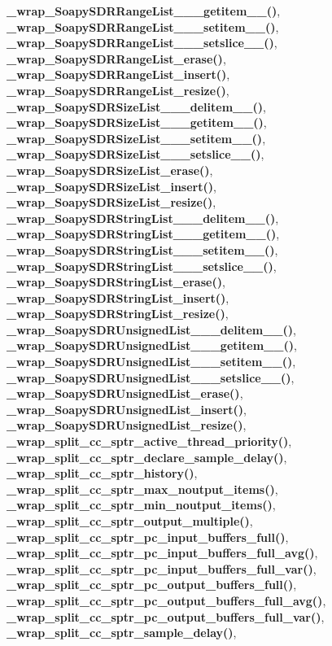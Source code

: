 {\bf \+\_\+wrap\+\_\+\+Soapy\+S\+D\+R\+Range\+List\+\_\+\+\_\+\+\_\+getitem\+\_\+\+\_\+()}, {\bf \+\_\+wrap\+\_\+\+Soapy\+S\+D\+R\+Range\+List\+\_\+\+\_\+\+\_\+setitem\+\_\+\+\_\+()}, {\bf \+\_\+wrap\+\_\+\+Soapy\+S\+D\+R\+Range\+List\+\_\+\+\_\+\+\_\+setslice\+\_\+\+\_\+()}, {\bf \+\_\+wrap\+\_\+\+Soapy\+S\+D\+R\+Range\+List\+\_\+erase()}, {\bf \+\_\+wrap\+\_\+\+Soapy\+S\+D\+R\+Range\+List\+\_\+insert()}, {\bf \+\_\+wrap\+\_\+\+Soapy\+S\+D\+R\+Range\+List\+\_\+resize()}, {\bf \+\_\+wrap\+\_\+\+Soapy\+S\+D\+R\+Size\+List\+\_\+\+\_\+\+\_\+delitem\+\_\+\+\_\+()}, {\bf \+\_\+wrap\+\_\+\+Soapy\+S\+D\+R\+Size\+List\+\_\+\+\_\+\+\_\+getitem\+\_\+\+\_\+()}, {\bf \+\_\+wrap\+\_\+\+Soapy\+S\+D\+R\+Size\+List\+\_\+\+\_\+\+\_\+setitem\+\_\+\+\_\+()}, {\bf \+\_\+wrap\+\_\+\+Soapy\+S\+D\+R\+Size\+List\+\_\+\+\_\+\+\_\+setslice\+\_\+\+\_\+()}, {\bf \+\_\+wrap\+\_\+\+Soapy\+S\+D\+R\+Size\+List\+\_\+erase()}, {\bf \+\_\+wrap\+\_\+\+Soapy\+S\+D\+R\+Size\+List\+\_\+insert()}, {\bf \+\_\+wrap\+\_\+\+Soapy\+S\+D\+R\+Size\+List\+\_\+resize()}, {\bf \+\_\+wrap\+\_\+\+Soapy\+S\+D\+R\+String\+List\+\_\+\+\_\+\+\_\+delitem\+\_\+\+\_\+()}, {\bf \+\_\+wrap\+\_\+\+Soapy\+S\+D\+R\+String\+List\+\_\+\+\_\+\+\_\+getitem\+\_\+\+\_\+()}, {\bf \+\_\+wrap\+\_\+\+Soapy\+S\+D\+R\+String\+List\+\_\+\+\_\+\+\_\+setitem\+\_\+\+\_\+()}, {\bf \+\_\+wrap\+\_\+\+Soapy\+S\+D\+R\+String\+List\+\_\+\+\_\+\+\_\+setslice\+\_\+\+\_\+()}, {\bf \+\_\+wrap\+\_\+\+Soapy\+S\+D\+R\+String\+List\+\_\+erase()}, {\bf \+\_\+wrap\+\_\+\+Soapy\+S\+D\+R\+String\+List\+\_\+insert()}, {\bf \+\_\+wrap\+\_\+\+Soapy\+S\+D\+R\+String\+List\+\_\+resize()}, {\bf \+\_\+wrap\+\_\+\+Soapy\+S\+D\+R\+Unsigned\+List\+\_\+\+\_\+\+\_\+delitem\+\_\+\+\_\+()}, {\bf \+\_\+wrap\+\_\+\+Soapy\+S\+D\+R\+Unsigned\+List\+\_\+\+\_\+\+\_\+getitem\+\_\+\+\_\+()}, {\bf \+\_\+wrap\+\_\+\+Soapy\+S\+D\+R\+Unsigned\+List\+\_\+\+\_\+\+\_\+setitem\+\_\+\+\_\+()}, {\bf \+\_\+wrap\+\_\+\+Soapy\+S\+D\+R\+Unsigned\+List\+\_\+\+\_\+\+\_\+setslice\+\_\+\+\_\+()}, {\bf \+\_\+wrap\+\_\+\+Soapy\+S\+D\+R\+Unsigned\+List\+\_\+erase()}, {\bf \+\_\+wrap\+\_\+\+Soapy\+S\+D\+R\+Unsigned\+List\+\_\+insert()}, {\bf \+\_\+wrap\+\_\+\+Soapy\+S\+D\+R\+Unsigned\+List\+\_\+resize()}, {\bf \+\_\+wrap\+\_\+split\+\_\+cc\+\_\+sptr\+\_\+active\+\_\+thread\+\_\+priority()}, {\bf \+\_\+wrap\+\_\+split\+\_\+cc\+\_\+sptr\+\_\+declare\+\_\+sample\+\_\+delay()}, {\bf \+\_\+wrap\+\_\+split\+\_\+cc\+\_\+sptr\+\_\+history()}, {\bf \+\_\+wrap\+\_\+split\+\_\+cc\+\_\+sptr\+\_\+max\+\_\+noutput\+\_\+items()}, {\bf \+\_\+wrap\+\_\+split\+\_\+cc\+\_\+sptr\+\_\+min\+\_\+noutput\+\_\+items()}, {\bf \+\_\+wrap\+\_\+split\+\_\+cc\+\_\+sptr\+\_\+output\+\_\+multiple()}, {\bf \+\_\+wrap\+\_\+split\+\_\+cc\+\_\+sptr\+\_\+pc\+\_\+input\+\_\+buffers\+\_\+full()}, {\bf \+\_\+wrap\+\_\+split\+\_\+cc\+\_\+sptr\+\_\+pc\+\_\+input\+\_\+buffers\+\_\+full\+\_\+avg()}, {\bf \+\_\+wrap\+\_\+split\+\_\+cc\+\_\+sptr\+\_\+pc\+\_\+input\+\_\+buffers\+\_\+full\+\_\+var()}, {\bf \+\_\+wrap\+\_\+split\+\_\+cc\+\_\+sptr\+\_\+pc\+\_\+output\+\_\+buffers\+\_\+full()}, {\bf \+\_\+wrap\+\_\+split\+\_\+cc\+\_\+sptr\+\_\+pc\+\_\+output\+\_\+buffers\+\_\+full\+\_\+avg()}, {\bf \+\_\+wrap\+\_\+split\+\_\+cc\+\_\+sptr\+\_\+pc\+\_\+output\+\_\+buffers\+\_\+full\+\_\+var()}, {\bf \+\_\+wrap\+\_\+split\+\_\+cc\+\_\+sptr\+\_\+sample\+\_\+delay()}, 